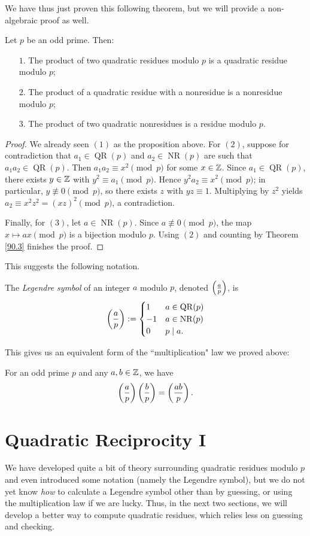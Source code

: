 \documentclass{article}
\newcommand{\leg}[2]{\paren{\frac{#1}{#2}}}
\DeclareMathOperator{\QR}{\mathrm{QR}}
\DeclareMathOperator{\NR}{\mathrm{NR}}
\begin{document}
We have thus just proven this following theorem, but we will provide a non-algebraic proof as well.
\begin{theorem}
Let $p$ be an odd prime. Then:
\begin{enumerate}
    \item[$1.$] The product of two quadratic residues modulo $p$ is a quadratic residue modulo $p$;
    \item[$2.$] The product of a quadratic residue with a nonresidue is a nonresidue modulo $p$;
    \item[$3.$] The product of two quadratic nonresidues is a residue modulo $p$.
\end{enumerate}
\end{theorem}
\begin{proof}
We already seen $(1)$ as the proposition above. For $(2)$, suppose for contradiction that $a_1\in \QR(p)$ and $a_2\in\NR(p)$ are such that $a_1a_2\in \QR(p)$. Then $a_1a_2 \equiv x^2\pmod p$ for some $x\in\mathbb Z$. Since $a_1\in \QR(p)$, there exists $y\in\mathbb Z$ with $y^2\equiv a_1\pmod p$. Hence $y^2a_2\equiv x^2\pmod p$; in particular, $y\not\equiv 0\pmod p$, so there exists $z$ with $yz\equiv 1$. Multiplying by $z^2$ yields $a_2\equiv x^2z^2 = (xz)^2\pmod p$, a contradiction.

Finally, for $(3)$, let $a\in \NR(p)$. Since $a\not \equiv 0\pmod p$, the map $x\mapsto ax\pmod p$ is a bijection modulo $p$. Using $(2)$ and counting by Theorem \ref{90.3} finishes the proof.
\end{proof}

This suggests the following notation.
\begin{definition}
The \textit{Legendre symbol} of an integer $a$ modulo $p$, denoted $\leg ap$, is
$$\leg ap := \begin{cases}
    1 & a\in \QR(p) \\ -1 & a\in \NR(p) \\ 0 & p\mid a.
\end{cases}$$

This gives us an equivalent form of the ``multiplication" law we proved above:
\begin{corollary}
For an odd prime $p$ and any $a,b\in \mathbb Z$, we have $$\ds \leg ap\leg bp = \leg{ab}p.$$
\end{corollary}
\end{definition}

\setcounter{section}{93}
\section{Quadratic Reciprocity I}
We have developed quite a bit of theory surrounding quadratic residues modulo $p$ and even introduced some notation (namely the Legendre symbol), but we do not yet know \textit{how} to calculate a Legendre symbol other than by guessing, or using the multiplication law if we are lucky. Thus, in the next two sections, we will develop a better way to compute quadratic residues, which relies less on guessing and checking.
\end{document}
